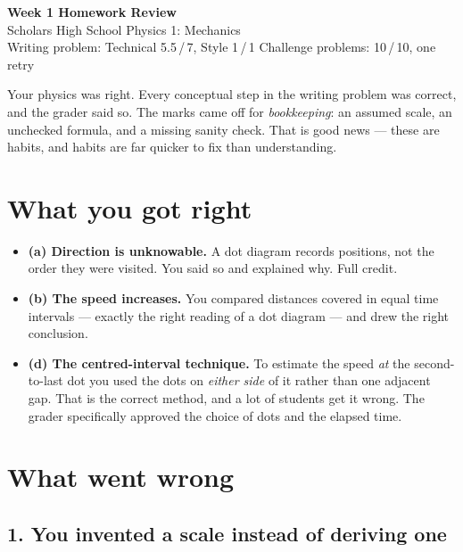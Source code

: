 \documentclass[11pt]{article}
\begin{document}
\begin{center}
{\LARGE\bfseries Week 1 Homework Review}\\[4pt]
{\large Scholars High School Physics 1: Mechanics}\\[6pt]
{\small Writing problem: Technical 5.5\,/\,7, Style 1\,/\,1 \quad\textperiodcentered\quad
Challenge problems: 10\,/\,10, one retry}
\end{center}

\vspace{4pt}

\begin{point}
Your physics was right. Every conceptual step in the writing problem was correct, and
the grader said so. The marks came off for \emph{bookkeeping}: an assumed scale, an
unchecked formula, and a missing sanity check. That is good news --- these are habits,
and habits are far quicker to fix than understanding.
\end{point}

\section{What you got right}

\begin{whatright}
\begin{itemize}
  \item \textbf{(a) Direction is unknowable.} A dot diagram records positions, not the
        order they were visited. You said so and explained why. Full credit.
  \item \textbf{(b) The speed increases.} You compared distances covered in equal time
        intervals --- exactly the right reading of a dot diagram --- and drew the right
        conclusion.
  \item \textbf{(d) The centred-interval technique.} To estimate the speed \emph{at} the
        second-to-last dot you used the dots on \emph{either side} of it rather than one
        adjacent gap. That is the correct method, and a lot of students get it wrong.
        The grader specifically approved the choice of dots and the elapsed time.
\end{itemize}
\end{whatright}

\section{What went wrong}

\subsection*{1. You invented a scale instead of deriving one}
\end{document}
